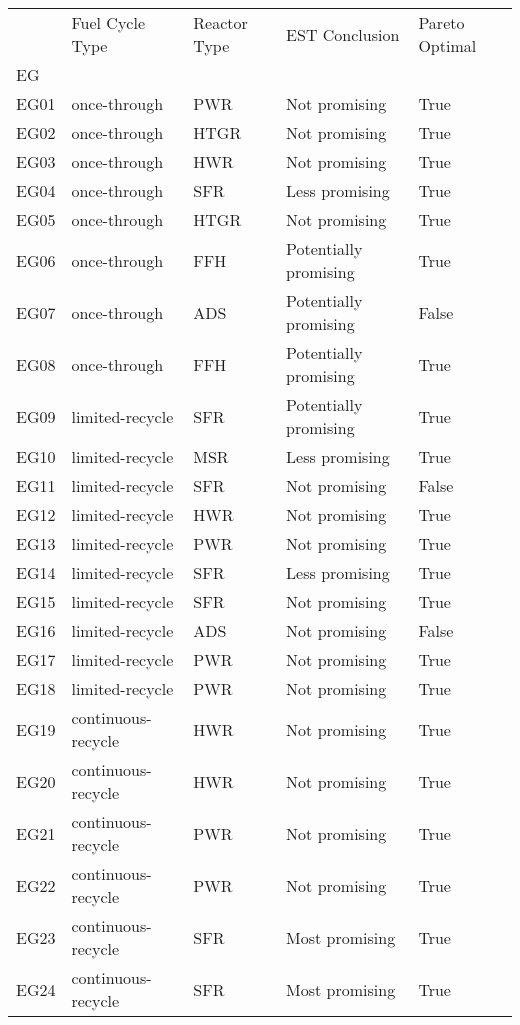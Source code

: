 \begin{tabular}{lllll}
\toprule
 & Fuel Cycle Type & Reactor Type & EST Conclusion & Pareto Optimal \\
EG &  &  &  &  \\
\midrule
EG01 & once-through & PWR & Not promising & True \\
EG02 & once-through & HTGR & Not promising & True \\
EG03 & once-through & HWR & Not promising & True \\
\rowcolor{yellow}
EG04 & once-through & SFR & Less promising & True \\
EG05 & once-through & HTGR & Not promising & True \\
EG06 & once-through & FFH & Potentially promising & True \\
\rowcolor{yellow}
EG07 & once-through & ADS & Potentially promising & False \\
EG08 & once-through & FFH & Potentially promising & True \\
EG09 & limited-recycle & SFR & Potentially promising & True \\
EG10 & limited-recycle & MSR & Less promising & True \\
EG11 & limited-recycle & SFR & Not promising & False \\
EG12 & limited-recycle & HWR & Not promising & True \\
EG13 & limited-recycle & PWR & Not promising & True \\
EG14 & limited-recycle & SFR & Less promising & True \\
EG15 & limited-recycle & SFR & Not promising & True \\
EG16 & limited-recycle & ADS & Not promising & False \\
EG17 & limited-recycle & PWR & Not promising & True \\
EG18 & limited-recycle & PWR & Not promising & True \\
EG19 & continuous-recycle & HWR & Not promising & True \\
EG20 & continuous-recycle & HWR & Not promising & True \\
EG21 & continuous-recycle & PWR & Not promising & True \\
EG22 & continuous-recycle & PWR & Not promising & True \\
EG23 & continuous-recycle & SFR & Most promising & True \\
EG24 & continuous-recycle & SFR & Most promising & True \\

\end{tabular}
